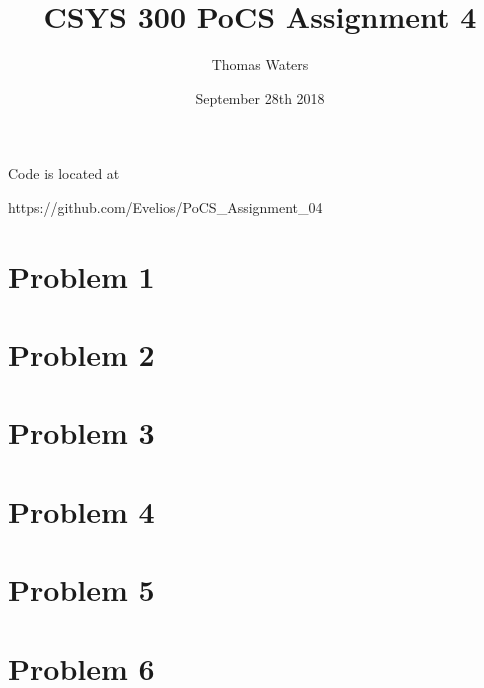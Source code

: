 \documentclass{article}
\title{CSYS 300 PoCS Assignment 4}
\author{Thomas Waters}
\date{September 28th 2018}
\begin{document}
\maketitle
Code is located at

https://github.com/Evelios/PoCS\_Assignment\_04

\section{Problem 1}


\section{Problem 2}


\section{Problem 3}


\section{Problem 4}


\section{Problem 5}


\section{Problem 6}

\end{document}
